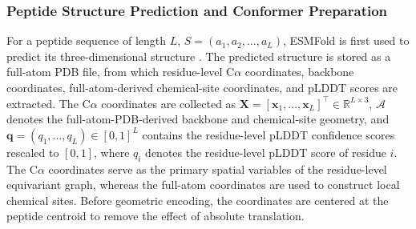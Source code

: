 \documentclass[12pt]{article}
\begin{document}
\subsubsection{Peptide Structure Prediction and Conformer Preparation}
For a peptide sequence of length $L$, $S = (a_1, a_2, \ldots, a_L)$,
ESMFold is first used to predict its three-dimensional structure
\cite{lin2023esmfold}. The predicted structure is stored as a full-atom PDB file,
from which residue-level C$\alpha$ coordinates, backbone coordinates,
full-atom-derived chemical-site coordinates, and pLDDT scores are extracted.
The C$\alpha$ coordinates are collected as $\mathbf X = [\mathbf x_1, \ldots,
\mathbf x_L]^{\top} \in \mathbb{R}^{L\times3}$, $\mathcal{A}$ denotes the
full-atom-PDB-derived backbone and chemical-site geometry, and
$\mathbf q = (q_1, \ldots, q_L) \in [0,1]^L$ contains the residue-level pLDDT
confidence scores rescaled to $[0,1]$, where $q_i$ denotes the residue-level
pLDDT score of residue $i$. The C$\alpha$ coordinates serve as the primary spatial variables of
the residue-level equivariant graph, whereas the full-atom coordinates are
used to construct local chemical sites. Before geometric encoding, the
coordinates are centered at the peptide centroid to remove the effect of
absolute translation.
\end{document}
